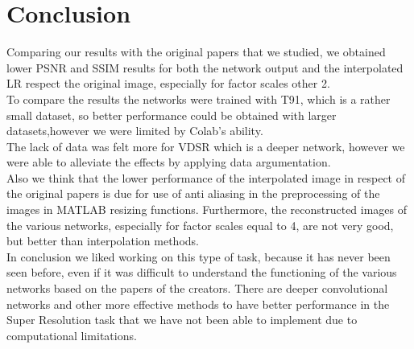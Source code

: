 \documentclass[10pt,twocolumn,letterpaper]{article}
\begin{document}
\section{Conclusion}
Comparing our results with the original papers that we studied, we obtained lower PSNR and SSIM results for both the network output and the interpolated LR respect the original image, especially for factor scales other 2.\\
To compare the results the networks were trained with T91, which is a rather small dataset, so better performance could be obtained with larger datasets,however we were limited by Colab's ability.\\
The lack of data was felt more for VDSR which is a deeper network, however we were able to alleviate the effects by applying data argumentation.\\
Also we think that the lower performance of the interpolated image in respect of the original papers is due for use of anti aliasing in the preprocessing of the images in MATLAB resizing functions.
Furthermore, the reconstructed images of the various networks, especially for factor scales equal to 4, are not very good, but better than interpolation methods.\\

In conclusion we liked working on this type of task, because it has never been seen before, even if it was difficult to understand the functioning of the various networks based on the papers of the creators. There are deeper convolutional networks and other more effective methods to have better performance in the Super Resolution task that we have not been able to implement due to computational limitations.

{\small


}
\end{document}
